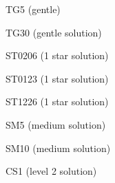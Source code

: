 \documentclass[10pt,letterpaper]{article}
\author{Germ\'{a}n Avendaño Ram\'{i}rez}
\begin{document}
\cluefont{\normalsize}

\begin{minipage}{0.95\linewidth}\begin{center}
TG5 (gentle) \\
\end{center}\end{minipage}\hfill
\begin{minipage}{0.47\linewidth}\begin{center}
TG30 (gentle solution) \\
\end{center}\end{minipage}
\vspace*{12pt}

\begin{minipage}{0.47\linewidth}\begin{center}
ST0206 (1 star solution) \\
\end{center}\end{minipage}\hfill
\noindent\begin{minipage}{0.47\linewidth}\begin{center}
ST0123 (1 star solution) \\
\end{center}\end{minipage}
\vspace*{12pt}

\begin{minipage}{0.47\linewidth}\begin{center}
ST1226 (1 star solution) \\
\end{center}\end{minipage}\hfill
\noindent\begin{minipage}{0.47\linewidth}\begin{center}
SM5 (medium solution) \\
\end{center}\end{minipage}

\begin{minipage}{0.47\linewidth}\begin{center}
SM10 (medium solution) \\
\end{center}\end{minipage}\hfill
\begin{minipage}{0.47\linewidth}\begin{center}
CS1 (level 2 solution) \\
\end{center}\end{minipage}
\end{document}
